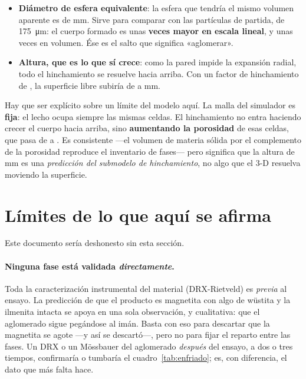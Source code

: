 \documentclass[11pt,a4paper]{article}
\begin{document}
\begin{itemize}[leftmargin=*]
  \item \textbf{Diámetro de esfera equivalente}: la esfera que tendría el mismo
        volumen aparente es de \datDesfe{}
        \si{\milli\meter}. Sirve para comparar con las partículas de partida,
        de \SI{175}{\micro\meter}: el cuerpo formado es unas
        \textbf{\datCrecimientoLineal{} veces mayor en escala lineal}, y unas
        \datCrecimientoVolumen{} veces en volumen. Ése es el salto que significa
        «aglomerar».
  \item \textbf{Altura, que es lo que sí crece}: como la pared impide la
        expansión radial, todo el hinchamiento se resuelve hacia arriba. Con un
        factor de hinchamiento de \datHinchamiento{}, la superficie libre
        subiría de \datAltura{} a \datAlturaLibre{} \si{\milli\meter}.
\end{itemize}

\noindent
Hay que ser explícito sobre un límite del modelo aquí. La malla del simulador es
\textbf{fija}: el lecho ocupa siempre las mismas celdas. El hinchamiento no
entra haciendo crecer el cuerpo hacia arriba, sino \textbf{aumentando la
porosidad} de esas celdas, que pasa de \datEpsInicial{} a
\datEpsFinal{}. Es consistente ---el volumen de materia sólida por
el complemento de la porosidad reproduce el inventario de fases--- pero
significa que la altura de \datAlturaLibre{}
\si{\milli\meter} es una \emph{predicción del submodelo de hinchamiento}, no
algo que el 3-D resuelva moviendo la superficie.

\section{Límites de lo que aquí se afirma}
\label{sec:limites}

Este documento sería deshonesto sin esta sección.

\paragraph{Ninguna fase está validada \emph{directamente}.} Toda la
caracterización instrumental del material (DRX-Rietveld) es \emph{previa} al
ensayo. La predicción de que el producto es magnetita con algo de wüstita y la
ilmenita intacta se apoya en una sola observación, y cualitativa: que el
aglomerado sigue pegándose al imán. Basta con eso para descartar que la
magnetita se agote ---y así se descartó---, pero no para fijar el reparto entre
las fases. Un DRX o un Mössbauer del aglomerado \emph{después} del ensayo, a dos
o tres tiempos, confirmaría o tumbaría el cuadro~\ref{tab:enfriado}; es, con
diferencia, el dato que más falta hace.
\end{document}
